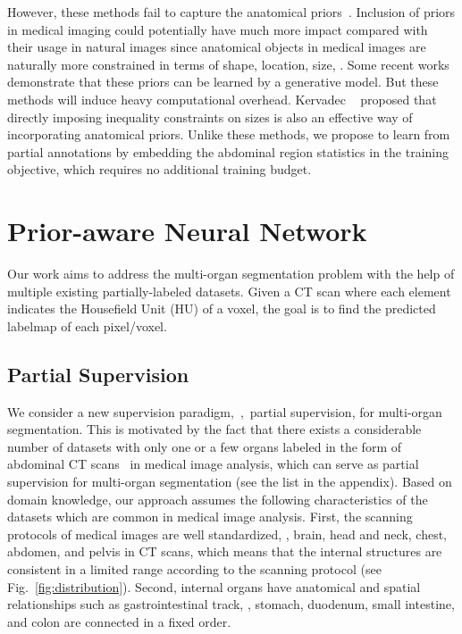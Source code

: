 \documentclass[10pt,twocolumn,letterpaper]{article}
\begin{document}
However, these methods fail to capture the anatomical priors~\cite{litjens2017survey}. Inclusion of priors in medical imaging could potentially have much more impact compared with their usage in natural images since anatomical objects in medical images are naturally more constrained in terms of shape, location, size, \etc. Some recent works~\cite{dalca2018anatomical, oktay2018anatomically} demonstrate that these priors can be learned by a generative model. But these methods will induce heavy computational overhead. Kervadec \etal~\cite{kervadec2019constrained} proposed that  directly imposing inequality constraints on sizes is also an effective way of incorporating anatomical priors. Unlike these methods, we propose to learn from partial annotations by embedding the abdominal region statistics in the training objective, which requires no additional training budget.



\section{Prior-aware Neural Network}
Our work aims to address the multi-organ segmentation problem with the help of multiple existing partially-labeled datasets. Given a CT scan where each element indicates the Housefield Unit (HU) of a voxel, the goal is to find the predicted labelmap of each pixel/voxel. 



\subsection{Partial Supervision} \label{sec:partial}
We consider a new supervision paradigm,~\ie,~partial supervision, for multi-organ segmentation. This is motivated by the fact that there exists a considerable number of datasets with only one or a few organs labeled  in the form of abdominal CT scans~\cite{roth2015deeporgan, roth2018multi, simpson2019large} in medical image analysis, which can serve as partial supervision for multi-organ segmentation (see the list in the appendix). Based on domain knowledge, our approach assumes the following characteristics of the datasets which are common in medical image analysis. First, the scanning protocols of medical images are well standardized, \eg, brain, head and neck, chest, abdomen, and pelvis in CT scans, which means that the internal structures are consistent in a limited range according to the scanning protocol (see Fig.~\ref{fig:distribution}). Second, internal organs have anatomical and spatial relationships such as gastrointestinal track, \ie, stomach, duodenum, small intestine, and colon are connected in a fixed order. 
\end{document}
